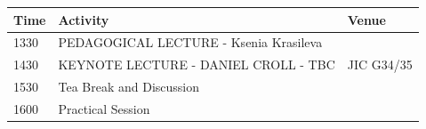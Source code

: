 \documentclass[12pt,]{book}
\begin{document}
\begin{longtable}[]{@{}lll@{}}
\toprule
\begin{minipage}[b]{0.09\columnwidth}\raggedright\strut
Time\strut
\end{minipage} & \begin{minipage}[b]{0.39\columnwidth}\raggedright\strut
Activity\strut
\end{minipage} & \begin{minipage}[b]{0.13\columnwidth}\raggedright\strut
Venue\strut
\end{minipage}\tabularnewline
\midrule
\endhead
\begin{minipage}[t]{0.09\columnwidth}\raggedright\strut
1330\strut
\end{minipage} & \begin{minipage}[t]{0.39\columnwidth}\raggedright\strut
PEDAGOGICAL LECTURE - Ksenia Krasileva\strut
\end{minipage} & \begin{minipage}[t]{0.13\columnwidth}\raggedright\strut
\strut
\end{minipage}\tabularnewline
\begin{minipage}[t]{0.09\columnwidth}\raggedright\strut
1430\strut
\end{minipage} & \begin{minipage}[t]{0.39\columnwidth}\raggedright\strut
KEYNOTE LECTURE - DANIEL CROLL - TBC\strut
\end{minipage} & \begin{minipage}[t]{0.13\columnwidth}\raggedright\strut
JIC G34/35\strut
\end{minipage}\tabularnewline
\begin{minipage}[t]{0.09\columnwidth}\raggedright\strut
1530\strut
\end{minipage} & \begin{minipage}[t]{0.39\columnwidth}\raggedright\strut
Tea Break and Discussion\strut
\end{minipage} & \begin{minipage}[t]{0.13\columnwidth}\raggedright\strut
\strut
\end{minipage}\tabularnewline
\begin{minipage}[t]{0.09\columnwidth}\raggedright\strut
1600\strut
\end{minipage} & \begin{minipage}[t]{0.39\columnwidth}\raggedright\strut
Practical Session\strut
\end{minipage} & \begin{minipage}[t]{0.13\columnwidth}\raggedright\strut
\strut
\end{minipage}\tabularnewline
\bottomrule
\end{longtable}
\end{document}
